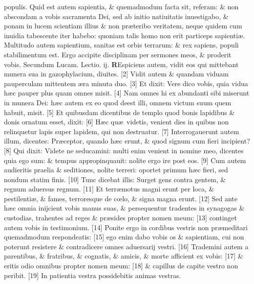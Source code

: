 \documentclass[a5paper,10pt]{book}
\def\rightmarginnote{%
	\lrmarginnote{\hskip\columnwidth \hskip -1em}}
\def\ae{æ}
\def\oe{œ}
\begin{document}
\begin{multicols*}{2}
populis.
Quid est autem sapientia, \& quemadmodum facta sit, referam: \& non abscondam a vobis sacramenta Dei, sed ab initio natiuitatis inuestigabo, \& ponam in lucem scientiam illius \& non pr\ae teribo veritatem, neque quidem cum inuidia tabescente iter habebo: quoniam talis homo non erit particeps sapienti\ae .
Multitudo autem sapientium, sanitas est orbis terrarum: \& rex sapiens, populi stabilimentum est. Ergo accipite disciplinam per sermones meos, \& proderit vobis.
\newline \color{red} Secundum Lucam. \hfill Lectio. ij. \color{black}
\vspace{-.25em}
\lettrine[lines=2]{\bfseries \color{red} R}{}Espiciens\rightmarginnote{c. 21.} autem, vidit eos qui mittebant munera sua in gazophylacium, diuites. [2] Vidit autem \& quandam viduam pauperculam mittentem \ae ra minuta duo. [3] Et dixit: Vere dico vobis, quia vidua h\ae c pauper plus quam omnes misit. [4] Nam omnes hi ex abundanti sibi miserunt in munera Dei: h\ae c autem ex eo quod deest illi, omnem victum suum quem habuit, misit. [5] Et quibusdam dicentibus de templo quod bonis lapidibus \& donis ornatum esset, dixit:
[6] H\ae c qu\ae \ videtis, venient dies in quibus non relinquetur lapis super lapidem, qui non destruatur. [7] Interrogauerunt autem illum, dicentes: Pr\ae ceptor, quando h\ae c erunt, \& quod signum cum fieri incipient? [8] Qui dixit: Videte ne seducamini: multi enim venient in nomine meo, dicentes quia ego sum: \& tempus appropinquauit: nolite ergo ire post eos. [9] Cum autem audieritis praelia \& seditiones, nolite terreri: oportet primum h\ae c fieri, sed nondum statim finis. [10] Tunc dicebat illis: Surget gens contra gentem, \& regnum aduersus regnum.
[11] Et terr\ae motus magni erunt per loca, \& pestilenti\ae , \& fames, terroresque de c\oe lo, \& signa magna erunt. [12] Sed ante h\ae c omnia inijcient vobis manus suas, \& persequentur tradentes in synagogas \& custodias, trahentes ad reges \& pr\ae sides propter nomen meum: [13] continget autem vobis in testimonium. [14] Ponite ergo in cordibus vestris non pr\ae meditari quemadmodum respondeatis: [15] ego enim dabo vobis os \& sapientiam, cui non poterunt resistere \& contradicere omnes aduersarij vestri.
[16] Trademini autem a parentibus, \& fratribus, \& cognatis, \& amicis, \& morte afficient ex vobis: [17] \& eritis odio omnibus propter nomen meum: [18] \& capillus de capite vestro non peribit. [19] In patientia vestra possidebitis animas vestras.

\end{multicols*}
\end{document}
